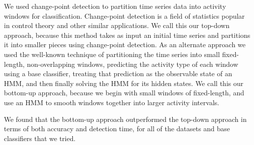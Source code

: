 We used change-point detection to partition time series data into activity windows for classification.
Change-point detection is a field of statistics popular in control theory and other similar
applications. We call this our top-down approach, because this
method takes as input an initial time series and partitions it into smaller pieces using
change-point detection. As an alternate approach we
used the well-known technique of partitioning the time series into small fixed-length,
non-overlapping windows, predicting the activity type of each window
using a base classifier, treating that prediction as the observable
state of an HMM, and then finally solving the HMM for its hidden states. We call
this our bottom-up approach, because we begin with small windows of fixed-length,
and use an HMM to smooth windows together into larger activity intervals.

We found that the bottom-up approach outperformed the top-down approach in
terms of both accuracy and detection time, for all of the datasets and base
classifiers that we tried.
